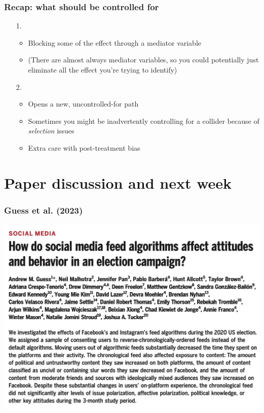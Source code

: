 \documentclass[aspectratio=43]{beamer}
\begin{document}
\begin{frame}
\frametitle{Recap: what should  be controlled for}
\centering

\begin{itemize}
  \item[1.] 
  \begin{itemize}
    \item Blocking some of the effect through a mediator variable
    \item (There are almost always mediator variables, so you could potentially just eliminate all the effect you're trying to identify)
  \end{itemize}
  \item[]
  \item[2.] 
  \begin{itemize}
    \item Opens a new, uncontrolled-for path
    \item Sometimes you might be inadvertently controlling for a collider because of \textit{selection} issues
    \item Extra care with post-treatment bias
  \end{itemize}
\end{itemize}

\end{frame}

\section{Paper discussion and next week}

\begin{frame}
\frametitle{Guess et al. (2023)}
\centering

\includegraphics[width = \textwidth]{../img/guess2023}

\end{frame}
\end{document}
